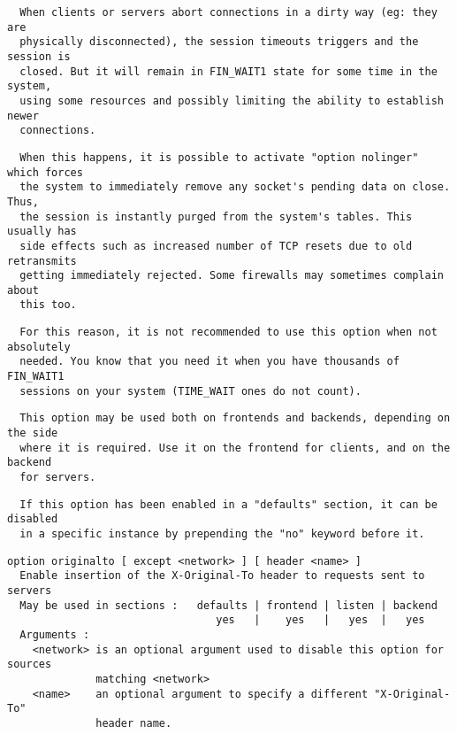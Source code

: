 \begin{verbatim}
  When clients or servers abort connections in a dirty way (eg: they are
  physically disconnected), the session timeouts triggers and the session is
  closed. But it will remain in FIN_WAIT1 state for some time in the system,
  using some resources and possibly limiting the ability to establish newer
  connections.
\end{verbatim}

\begin{verbatim}
  When this happens, it is possible to activate "option nolinger" which forces
  the system to immediately remove any socket's pending data on close. Thus,
  the session is instantly purged from the system's tables. This usually has
  side effects such as increased number of TCP resets due to old retransmits
  getting immediately rejected. Some firewalls may sometimes complain about
  this too.
\end{verbatim}

\begin{verbatim}
  For this reason, it is not recommended to use this option when not absolutely
  needed. You know that you need it when you have thousands of FIN_WAIT1
  sessions on your system (TIME_WAIT ones do not count).
\end{verbatim}

\begin{verbatim}
  This option may be used both on frontends and backends, depending on the side
  where it is required. Use it on the frontend for clients, and on the backend
  for servers.
\end{verbatim}

\begin{verbatim}
  If this option has been enabled in a "defaults" section, it can be disabled
  in a specific instance by prepending the "no" keyword before it.
\end{verbatim}

\begin{verbatim}
option originalto [ except <network> ] [ header <name> ]
  Enable insertion of the X-Original-To header to requests sent to servers
  May be used in sections :   defaults | frontend | listen | backend
                                 yes   |    yes   |   yes  |   yes
  Arguments :
    <network> is an optional argument used to disable this option for sources
              matching <network>
    <name>    an optional argument to specify a different "X-Original-To"
              header name.
\end{verbatim}

